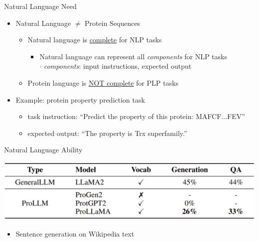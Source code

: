 \begin{frame}{Natural Language Need}
	\begin{itemize}\setlength\itemsep{3em}
		\item Natural Language $\neq$ Protein Sequences
		\begin{itemize}\setlength\itemsep{1em}
			\item Natural language is \underline{complete} for NLP tasks
			\begin{itemize}
				\item Natural language can represent all \emph{components} for NLP tasks
				\\$\cdot$ \emph{components}: input instructions, expected output
			\end{itemize}
			\item Protein language is \underline{NOT complete} for PLP tasks
		\end{itemize}
		\item Example: protein property prediction task
		\begin{itemize}
			\item task instruction: ``Predict the property of this protein: MAFCF...FEV''
			\item expected output: ``The property is Trx superfamily.''
		\end{itemize}
	\end{itemize}
\end{frame}

\begin{frame}{Natural Language Ability}
	\begin{center}
		\includegraphics[scale=0.21]{tables/natural_language_ability_comparison.png}
	\end{center}
	\begin{itemize}
		\item Sentence generation on Wikipedia text
	\end{itemize}
\end{frame}